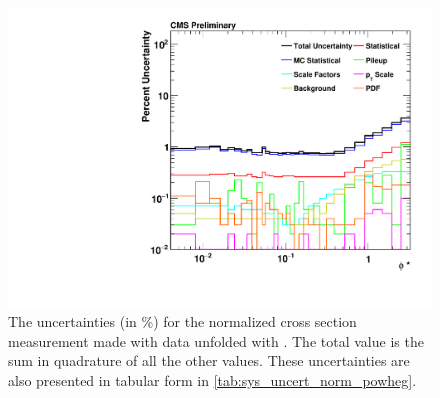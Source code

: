 \begin{figure}[!p]
    \centering
    \includegraphics[width=\textwidth]{figures/data_uncertainty_normalized_powheg_unfolded.pdf}
    \caption[
        The uncertainty for the normalized cross section measurement made with
        data unfolded with \POWHEG.
    ]{
        The uncertainties (in \%) for the normalized cross section measurement
        made with data unfolded with \POWHEG. The total value is the sum in
        quadrature of all the other values. These uncertainties are also
        presented in tabular form in \cref{tab:sys_uncert_norm_powheg}.
    }
    \label{fig:sys_uncert_norm_powheg}
\end{figure}
